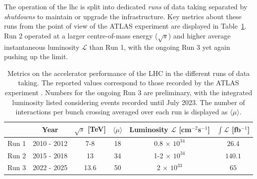 The operation of the \gls{lhc} is split into dedicated \textit{runs} of data taking separated by \textit{shutdowns} to maintain or upgrade the infrastructure. Key metrics about these runs from the point of view of the ATLAS experiment are displayed in Table~\ref{tbl:LHCATLASperf}. Run 2 operated at a larger centre-of-mass energy ($\sqrt{s}$) and higher average instantaneous luminosity $\mathcal{L}$ than Run 1, with the ongoing Run 3 yet again pushing up the limit.\\

{
\vspace{-1cm}
\begin{table}[!htbp]
  \begin{center}
      \renewcommand{\arraystretch}{1.2}
      \begin{tabular}{cc|cccc} \hline \hline 
        & Year & $\sqrt{s}$ [TeV] & $\langle \mu \rangle$ &  Luminosity $\mathcal{L}$ [cm$^{-2}$s$^{-1}$] & $\int\mathcal{L}$ [fb$^{-1}$] \\ \hline
        Run 1 & 2010 - 2012 & 7-8    & 18 & 0.8 $\times$ $10^{34}$    & $26.4$ \\
        Run 2 & 2015 - 2018 & 13     & 34 & 1-2 $\times$ $10^{34}$  & $140.1$ \\
        Run 3 & 2022 - 2025 & 13.6     & 50 & 2 $\times$ $10^{33}$    & $65$ \\

        \hline\hline
      \end{tabular}
    \caption{Metrics on the accelerator performance of the LHC in the different runs of data taking. The reported values correspond to those recorded by the ATLAS experiment \cite{ATLAS:run1Lumi, ATLAS:2022hro, ATL-DAPR-PUB-2023-001}. Numbers for the ongoing Run 3 are preliminary, with the integrated luminosity listed considering events recorded until July 2023. The number of interactions per bunch crossing averaged over each run is displayed as $\langle \mu \rangle$.}
    \label{tbl:LHCATLASperf}
  \end{center}
\end{table}
}

